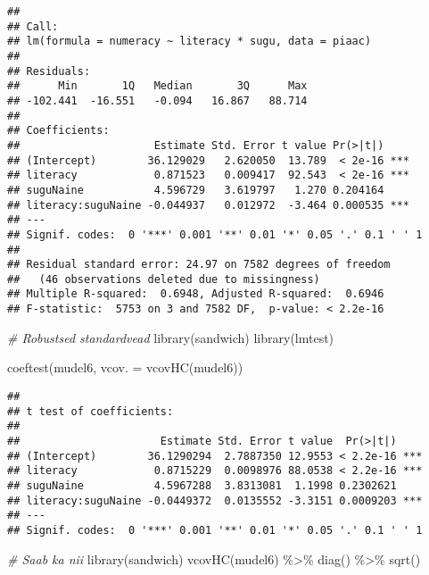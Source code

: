 \documentclass[
]{book}
\newenvironment{Shaded}{\begin{snugshade}}{\end{snugshade}}
\newcommand{\AttributeTok}[1]{\textcolor[rgb]{0.77,0.63,0.00}{#1}}
\newcommand{\CommentTok}[1]{\textcolor[rgb]{0.56,0.35,0.01}{\textit{#1}}}
\newcommand{\FunctionTok}[1]{\textcolor[rgb]{0.00,0.00,0.00}{#1}}
\newcommand{\NormalTok}[1]{#1}
\newcommand{\SpecialCharTok}[1]{\textcolor[rgb]{0.00,0.00,0.00}{#1}}
\begin{document}
\begin{verbatim}
## 
## Call:
## lm(formula = numeracy ~ literacy * sugu, data = piaac)
## 
## Residuals:
##      Min       1Q   Median       3Q      Max 
## -102.441  -16.551   -0.094   16.867   88.714 
## 
## Coefficients:
##                     Estimate Std. Error t value Pr(>|t|)    
## (Intercept)        36.129029   2.620050  13.789  < 2e-16 ***
## literacy            0.871523   0.009417  92.543  < 2e-16 ***
## suguNaine           4.596729   3.619797   1.270 0.204164    
## literacy:suguNaine -0.044937   0.012972  -3.464 0.000535 ***
## ---
## Signif. codes:  0 '***' 0.001 '**' 0.01 '*' 0.05 '.' 0.1 ' ' 1
## 
## Residual standard error: 24.97 on 7582 degrees of freedom
##   (46 observations deleted due to missingness)
## Multiple R-squared:  0.6948, Adjusted R-squared:  0.6946 
## F-statistic:  5753 on 3 and 7582 DF,  p-value: < 2.2e-16
\end{verbatim}

\begin{Shaded}
\begin{Highlighting}[]
\CommentTok{\# Robustsed standardvead}
\FunctionTok{library}\NormalTok{(sandwich)}
\FunctionTok{library}\NormalTok{(lmtest)}

\FunctionTok{coeftest}\NormalTok{(mudel6, }\AttributeTok{vcov. =} \FunctionTok{vcovHC}\NormalTok{(mudel6))}
\end{Highlighting}
\end{Shaded}

\begin{verbatim}
## 
## t test of coefficients:
## 
##                      Estimate Std. Error t value  Pr(>|t|)    
## (Intercept)        36.1290294  2.7887350 12.9553 < 2.2e-16 ***
## literacy            0.8715229  0.0098976 88.0538 < 2.2e-16 ***
## suguNaine           4.5967288  3.8313081  1.1998 0.2302621    
## literacy:suguNaine -0.0449372  0.0135552 -3.3151 0.0009203 ***
## ---
## Signif. codes:  0 '***' 0.001 '**' 0.01 '*' 0.05 '.' 0.1 ' ' 1
\end{verbatim}

\begin{Shaded}
\begin{Highlighting}[]
\CommentTok{\# Saab ka nii}
\FunctionTok{library}\NormalTok{(sandwich)}
\FunctionTok{vcovHC}\NormalTok{(mudel6) }\SpecialCharTok{\%\textgreater{}\%} 
  \FunctionTok{diag}\NormalTok{() }\SpecialCharTok{\%\textgreater{}\%} 
  \FunctionTok{sqrt}\NormalTok{()}
\end{Highlighting}
\end{Shaded}
\end{document}
